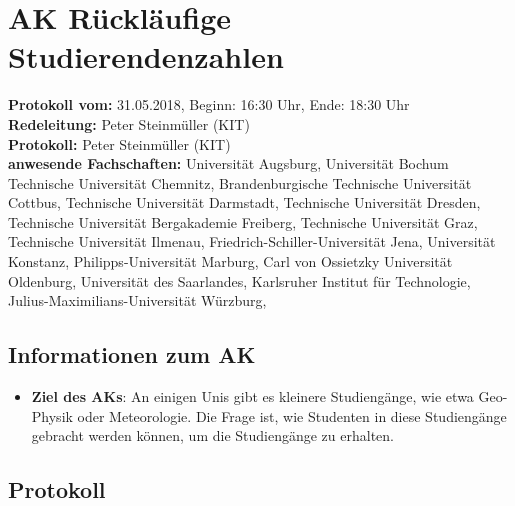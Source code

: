 
\section{AK Rückläufige Studierendenzahlen}

	\textbf{Protokoll vom:} 31.05.2018,
	Beginn: 16:30 Uhr,
	Ende: 18:30 Uhr \\
	\textbf{Redeleitung:} Peter Steinmüller (KIT) \\
	\textbf{Protokoll:} Peter Steinmüller (KIT) \\
	\textbf{anwesende Fachschaften:} Universität Augsburg, Universität Bochum Technische Universität Chemnitz, Brandenburgische Technische Universität Cottbus, Technische Universität Darmstadt, Technische Universität Dresden, Technische Universität Bergakademie Freiberg, Technische Universität Graz, Technische Universität Ilmenau, Friedrich-Schiller-Universität Jena, Universität Konstanz, Philipps-Universität Marburg, Carl von Ossietzky Universität Oldenburg, Universität des Saarlandes, Karlsruher Institut für Technologie, Julius-Maximilians-Universität Würzburg,

	\subsection*{Informationen zum AK}
		\begin{itemize}
			\item \textbf{Ziel des AKs}: An einigen Unis gibt es kleinere Studiengänge, wie etwa Geo-Physik oder Meteorologie. Die Frage ist, wie Studenten in diese Studiengänge gebracht werden können, um die Studiengänge zu erhalten.
		\end{itemize}

  \subsection*{Protokoll}
